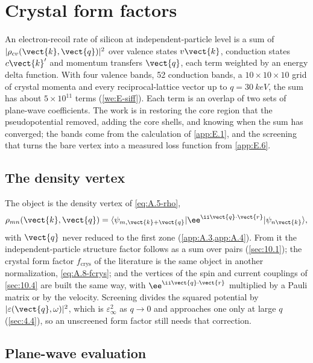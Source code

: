 \section{Crystal form factors}\label{app:E.7}

An electron-recoil rate of silicon at independent-particle level is a sum of $|\rho_{cv}(\vect{k},\vect{q})|^2$ over valence states $v\vect{k}$, conduction states $c\vect{k}'$ and momentum transfers $\vect{q}$, each term weighted by an energy delta function. With four valence bands, 52 conduction bands, a $10\times10\times10$ grid of crystal momenta and every reciprocal-lattice vector up to $q = \SI{30}{keV}$, the sum has about $5\times10^{11}$ terms (\cref{we:E-siff}). Each term is an overlap of two sets of plane-wave coefficients. The work is in restoring the core region that the pseudopotential removed, adding the core shells, and knowing when the sum has converged; the bands come from the calculation of \cref{app:E.1}, and the screening that turns the bare vertex into a measured loss function from \cref{app:E.6}.

\subsection{The density vertex}

The object is the density vertex of \cref{eq:A.5-rho},
\begin{equation*}
  \rho_{mn}(\vect{k},\vect{q}) = \langle\psi_{m,\vect{k}+\vect{q}}|\ee^{\ii\vect{q}\cdot\vect{r}}|\psi_{n\vect{k}}\rangle ,
\end{equation*}
with $\vect{q}$ never reduced to the first zone (\cref{app:A.3,app:A.4}). From it the independent-particle structure factor follows as a sum over pairs (\cref{sec:10.1}); the crystal form factor $f_{\mathrm{crys}}$ of the literature is the same object in another normalization, \cref{eq:A.8-fcrys}; and the vertices of the spin and current couplings of \cref{sec:10.4} are built the same way, with $\ee^{\ii\vect{q}\cdot\vect{r}}$ multiplied by a Pauli matrix or by the velocity. Screening divides the squared potential by $|\varepsilon(\vect{q},\omega)|^2$, which is $\varepsilon_\infty^2$ as $q \to 0$ and approaches one only at large $q$ (\cref{sec:4.4}), so an unscreened form factor still needs that correction.

\subsection{Plane-wave evaluation}

